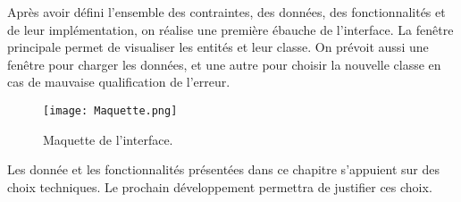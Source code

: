 Après avoir défini l'ensemble des contraintes, des données, des fonctionnalités et de leur implémentation, on réalise une première ébauche de l'interface. La fenêtre principale permet de visualiser les entités et leur classe. On prévoit aussi une fenêtre pour charger les données, et une autre pour choisir la nouvelle classe en cas de mauvaise qualification de l'erreur.

\begin{figure}[H]
	\begin{center}
		\texttt{[image: Maquette.png]}  \\
		\caption[Maquette de l'interface]{Maquette de l'interface.}
		\label{fig:maquette}
	\end{center}
\end{figure}

Les donnée et les fonctionnalités présentées dans ce chapitre s'appuient sur des choix techniques. Le prochain développement permettra de justifier ces choix.



